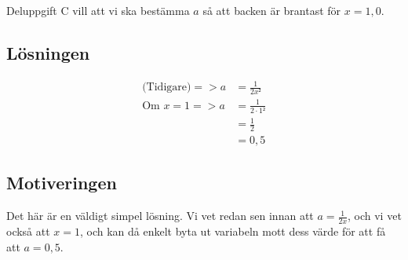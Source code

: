 \documentclass[a4paper,12pt]{article}
\begin{document}
    Deluppgift C \cite{Skolverk} vill att vi ska bestämma $a$ så att backen 
    är brantast för $x = 1,0$.

  \subsection{Lösningen}
  \label{eq:3}
    \begin{align}
      \text{(Tidigare)}
      => a &= \frac{1}{2x²} \nonumber 
      \\
      \text{Om } 
      x = 1 => 
      a &= \frac{1}{2\cdot1²} \nonumber 
      \\
      &= \frac{1}{2} \nonumber 
      \\
      &= 0,5
    \end{align}

  \subsection{Motiveringen}
    Det här är en väldigt simpel lösning. Vi vet redan sen innan att 
    $a = \frac{1}{2x}$, och vi vet också att $x = 1$, och kan då enkelt 
    byta ut variabeln mott dess värde för att få att $a = 0,5$.
\end{document}
